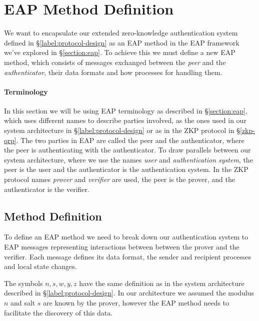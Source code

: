 \section{EAP Method Definition}
We want to encapsulate our extended zero-knowledge authentication system defined in \S\ref{label:protocol-design}  as an EAP method in the EAP framework we've explored in \S\ref{section:eap}.
To achieve this we must define a new EAP method, which consists of messages exchanged between the \textit{peer} and the \textit{authenticator}, their data formats and how processes for handling them.

\paragraph{Terminology}
In this section we will be using EAP terminology as described in \S\ref{section:eap}, which uses different names to describe parties involved, as the ones used in our system architecture in \S\ref{label:protocol-design} or as in the ZKP protocol in \S\ref{zkp-qrp}.
The two parties in EAP are called the peer and the authenticator, where the peer is authenticating with the authenticator.
To draw parallels between our system architecture, where we use the names \textit{user} and \textit{authentication system}, the peer is the user and the authenticator is the authentication system.
In the ZKP protocol names \textit{prover} and \textit{verifier} are used, the peer is the prover, and the authenticator is the verifier.


\subsection{Method Definition}

To define an EAP method we need to break down our authentication system to EAP messages representing interactions between between the prover and the verifier.
Each message defines its data format, the sender and recipient processes and local state changes.

The symbols $n, s, w, y, z$ have the same definition as in the system architecture described in \S\ref{label:protocol-design}.
In our architecture we assumed the modulus $n$ and salt $s$ are known by the prover, however the EAP method needs to facilitate the discovery of this data.


